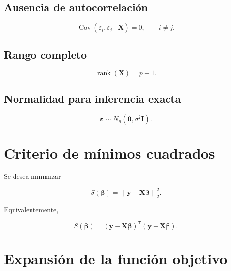 \documentclass[
  spanish,
  10.5pt,
  letterpaper,
  DIV=11,
  numbers=noendperiod,
  oneside,
  open=any]{scrreprt}
\theoremstyle{definition}
\theoremstyle{definition}
\theoremstyle{plain}
\theoremstyle{remark}
\begin{document}
\subsection*{Ausencia de
autocorrelación}\label{ausencia-de-autocorrelaciuxf3n}

\[
\operatorname{Cov}(\varepsilon_i,\varepsilon_j\mid\mathbf{X})
=
0,
\qquad i\neq j.
\]

\subsection*{Rango completo}\label{rango-completo}

\[
\operatorname{rank}(\mathbf{X})
=
p+1.
\]

\subsection*{Normalidad para inferencia
exacta}\label{normalidad-para-inferencia-exacta}

\[
\boldsymbol{\varepsilon}
\sim
N_n(\mathbf{0},\sigma^2\mathbf{I}).
\]

\section*{Criterio de mínimos
cuadrados}\label{criterio-de-muxednimos-cuadrados-1}


Se desea minimizar

\[
S(\boldsymbol{\beta})
=
\left\|
\mathbf{y}
-
\mathbf{X}\boldsymbol{\beta}
\right\|_2^2.
\]

Equivalentemente,

\[
S(\boldsymbol{\beta})
=
(\mathbf{y}-\mathbf{X}\boldsymbol{\beta})^{\mathsf T}
(\mathbf{y}-\mathbf{X}\boldsymbol{\beta}).
\]

\section*{Expansión de la función
objetivo}\label{expansiuxf3n-de-la-funciuxf3n-objetivo}

\end{document}
